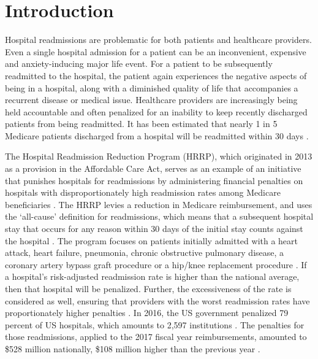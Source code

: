 \documentclass[sigconf]{acmart}
\begin{document}

\maketitle

\section{Introduction}

Hospital readmissions are problematic for both patients and healthcare providers. Even a single hospital admission for a patient can be an inconvenient, expensive and anxiety-inducing major life event. For a patient to be subsequently readmitted to the hospital, the patient again experiences the negative aspects of being in a hospital, along with a diminished quality of life that accompanies a recurrent disease or medical issue. Healthcare providers are increasingly being held accountable and often penalized for an inability to keep recently discharged patients from being readmitted. It has been estimated that nearly 1 in 5 Medicare patients discharged from a hospital will be readmitted within 30 days \cite{cite05}.

The Hospital Readmission Reduction Program (HRRP), which originated in 2013 as a provision in the Affordable Care Act, serves as an example of an initiative that punishes hospitals for readmissions by administering financial penalties on hospitals with disproportionately high readmission rates among Medicare beneficiaries \cite{cite06}. The HRRP levies a reduction in Medicare reimbursement, and uses the `all-cause' definition for readmissions, which means that a subsequent hospital stay that occurs for any reason within 30 days of the initial stay counts against the hospital \cite{cite06}. The program focuses on patients initially admitted with a heart attack, heart failure, pneumonia, chronic obstructive pulmonary disease, a coronary artery bypass graft procedure or a hip/knee replacement procedure \cite{cite06}. If a hospital's risk-adjusted readmission rate is higher than the national average, then that hospital will be penalized. Further, the excessiveness of the rate is considered as well, ensuring that providers with the worst readmission rates have proportionately higher penalties \cite{cite06}. In 2016, the US government penalized 79 percent of US hospitals, which amounts to 2,597 institutions \cite{cite00}. The penalties for those readmissions, applied to the 2017 fiscal year reimbursements, amounted to \$528 million nationally, \$108 million higher than the previous year \cite{cite00}.
\end{document}
